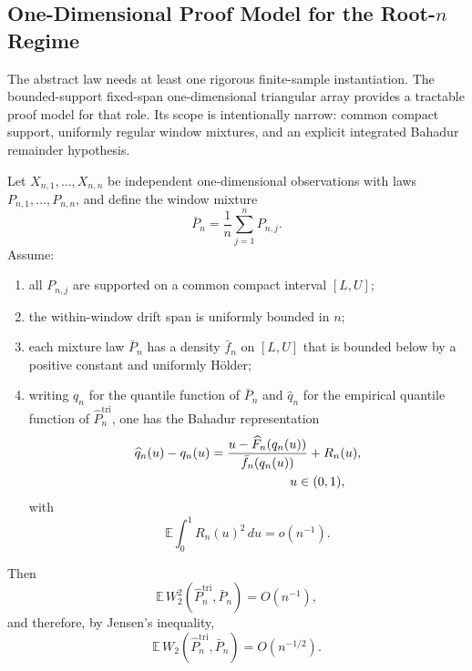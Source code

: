\subsection{One-Dimensional Proof Model for the Root-$n$ Regime}
\label{subsec:one_dimensional_proof_model}

The abstract law needs at least one rigorous finite-sample instantiation. The
bounded-support fixed-span one-dimensional triangular array provides a tractable
proof model for that role. Its scope is intentionally narrow: common compact
support, uniformly regular window mixtures, and an explicit integrated Bahadur
remainder hypothesis.

\begin{proposition}\label{prop:one_dimensional_root_n_bound}
Let $X_{n,1},\dots,X_{n,n}$ be independent one-dimensional observations with laws
$P_{n,1},\dots,P_{n,n}$, and define the window mixture
\[
  \bar P_n = \frac{1}{n}\sum_{j=1}^n P_{n,j}.
\]
Assume:
\begin{enumerate}[label=(\roman*)]
  \item all $P_{n,j}$ are supported on a common compact interval $[L,U]$;
  \item the within-window drift span is uniformly bounded in $n$;
  \item each mixture law $\bar P_n$ has a density $\bar f_n$ on $[L,U]$ that is
  bounded below by a positive constant and uniformly Hölder;
  \item writing $q_n$ for the quantile function of $\bar P_n$ and $\widehat q_n$
  for the empirical quantile function of $\widehat P_n^{\mathrm{tri}}$, one has
  the Bahadur representation
  \[
    \begin{aligned}
    \widehat q_n(u)-q_n(u)
    &= \frac{u-\widehat F_n(q_n(u))}{\bar f_n(q_n(u))} + R_n(u), \\
    &\hspace{2.2cm} u\in(0,1),
    \end{aligned}
  \]
  with
  \[
    \mathbb E\int_0^1 R_n(u)^2\,du=o(n^{-1}).
  \]
\end{enumerate}
Then
\[
  \mathbb E\,W_2^2\!\left(\widehat P_n^{\mathrm{tri}},\bar P_n\right)=O(n^{-1}),
\]
and therefore, by Jensen's inequality,
\[
  \mathbb E\,W_2\!\left(\widehat P_n^{\mathrm{tri}},\bar P_n\right)=O(n^{-1/2}).
\]
\end{proposition}

